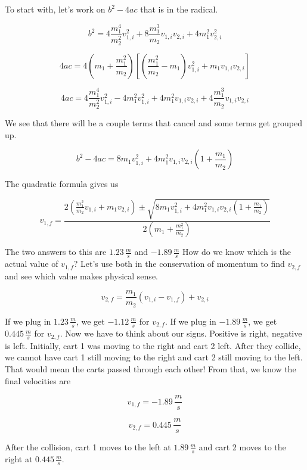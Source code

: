 \documentclass[12pt]{book}
\begin{document}
\begin{exampleblock}
To start with, let's work on $b^2 - 4ac$ that is in the radical.

\begin{equation}
b^2 = 4 \frac{m_1^4}{m_2^2} v_{1,i}^2 + 8 \frac{m_1^3}{m_2} v_{1,i} v_{2,i} + 4 m_1^2 v_{2,i}^2
\end{equation}

\begin{equation}
4ac = 4 \left( m_1 + \frac{m_1^2}{m_2} \right) \left[ \left( \frac{m_1^2}{m_2} - m_1 \right) v_{1,i}^2 + m_1 v_{1,i} v_{2,i} \right]
\end{equation}

\begin{equation}
4ac = 4 \frac{m_1^4}{m_2^2} v_{1,i}^2 - 4 m_1^2 v_{1,i}^2 + 4 m_1^2 v_{1,i}v_{2,i} + 4 \frac{m_1^3}{m_2} v_{1,i} v_{2,i}
\end{equation}

We see that there will be a couple terms that cancel and some terms get grouped up.

\begin{equation}
b^2 - 4ac = 8 m_1 v_{1,i}^2 + 4 m_1^2 v_{1,i} v_{2,i} \left( 1 + \frac{m_1}{m_2} \right)
\end{equation}

The quadratic formula gives us

\begin{equation}
v_{1,f} = \frac{2 \left(\frac{m_1^2}{m_2} v_{1,i} + m_1 v_{2,i} \right) \pm \sqrt{8 m_1 v_{1,i}^2 + 4 m_1^2 v_{1,i} v_{2,i} \left( 1 + \frac{m_1}{m_2} \right)}}{2 \left(m_1 + \frac{m_1^2}{m_2} \right)}
\end{equation}

The two answers to this are $1.23 \, \frac{m}{s}$ and $-1.89 \, \frac{m}{s}$ How do we know which is the actual value of $v_{1,f}$? Let's use both in the conservation of momentum to find $v_{2,f}$ and see which value makes physical sense.

\begin{equation}
v_{2,f} = \frac{m_1}{m_2} (v_{1,i} - v_{1,f}) + v_{2,i}
\end{equation}

If we plug in $1.23 \, \frac{m}{s}$, we get $-1.12 \, \frac{m}{s}$ for $v_{2,f}$. If we plug in $-1.89 \, \frac{m}{s}$, we get $0.445 \, \frac{m}{s}$ for $v_{2,f}$. Now we have to think about our signs. Positive is right, negative is left. Initially, cart 1 was moving to the right and cart 2 left. After they collide, we cannot have cart 1 still moving to the right and cart 2 still moving to the left. That would mean the carts passed through each other! From that, we know the final velocities are

\begin{equation}
v_{1,f} = -1.89 \, \frac{m}{s}
\end{equation}

\begin{equation}
v_{2,f} = 0.445 \, \frac{m}{s}
\end{equation}

After the collision, cart 1 moves to the left at $1.89 \, \frac{m}{s}$ and cart 2 moves to the right at $0.445 \, \frac{m}{s}$.

\end{exampleblock}
\end{document}
